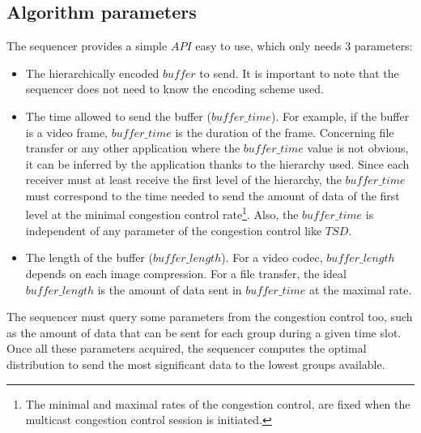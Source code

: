 \documentclass[a4paper]{article}
\begin{document}
    \subsection{Algorithm parameters}
        The sequencer provides a simple $API$ easy to use, which only needs $3$
        parameters:
        \begin{itemize}
            \item{
                The hierarchically encoded $buffer$ to send. It is important to
                    note that the sequencer does not need to know the 
                    encoding scheme used.
            }
            \item{
                The time allowed to send the buffer ($buffer\_time$). For
                    example, if the buffer is a video frame, $buffer\_time$ is
                    the duration of the frame.
Concerning file transfer or any other application where the
                    $buffer\_time$ value is not obvious, it can be inferred by
                    the application thanks to the hierarchy used.  Since each
                    receiver must at least receive the first level of the
                    hierarchy, the $buffer\_time$ must correspond to the time
                    needed to send the amount of data of the first level at the
                    minimal congestion control rate\footnote{
                        The minimal and maximal rates of the congestion control,
                            are fixed when the multicast congestion control
                                session is initiated.
                    }.
Also, the $buffer\_time$ is independent of any parameter of
                    the congestion control like $TSD$.
            }
            \item{
                The length of the buffer ($buffer\_length$).  For a video codec,
                    $buffer\_length$ depends on each image compression.  For a
                        file transfer, the ideal $buffer\_length$ is the amount
                        of data sent in $buffer\_time$ at the maximal
                        rate\footnotemark[\value{footnote}].
            }
        \end{itemize}
        The sequencer must query some parameters from the congestion control
        too, such as the amount of data that can be sent for each group during a
        given time slot.
Once all these parameters acquired, the sequencer computes the optimal
        distribution to send the most significant data to the lowest groups
        available.
\end{document}
